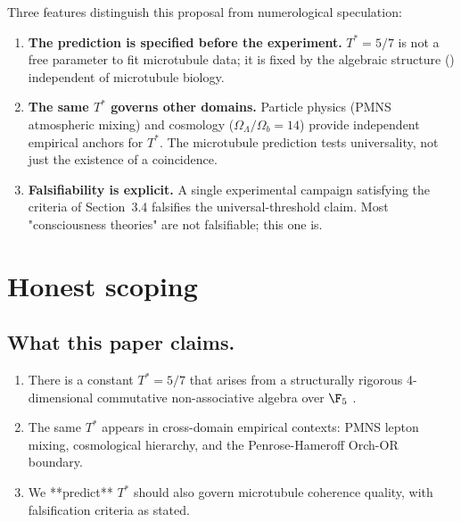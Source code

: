 \documentclass[11pt,reqno]{amsart}
\theoremstyle{plain}
\theoremstyle{definition}
\theoremstyle{remark}
\begin{document}
Three features distinguish this proposal from numerological
speculation:

\begin{enumerate}
\item \textbf{The prediction is specified before the experiment.}
$T^{*} = 5/7$ is not a free parameter to fit microtubule data; it is
fixed by the algebraic structure
(\cite{Sanders2026Dirac, Sanders2026Cosmology}) independent of
microtubule biology.

\item \textbf{The same $T^{*}$ governs other domains.} Particle
physics (PMNS atmospheric mixing) and cosmology
($\Omega_\Lambda / \Omega_b = 14$) provide independent empirical
anchors for $T^{*}$. The microtubule prediction tests universality,
not just the existence of a coincidence.

\item \textbf{Falsifiability is explicit.} A single experimental
campaign satisfying the criteria of Section~3.4 falsifies the
universal-threshold claim. Most "consciousness theories" are not
falsifiable; this one is.
\end{enumerate}

\section{Honest scoping}

\subsection{What this paper claims.}
\begin{enumerate}
\item There is a constant $T^{*} = 5/7$ that arises from a structurally
rigorous 4-dimensional commutative non-associative algebra over $\F_5$
\cite{Sanders2026Dirac}.
\item The same $T^{*}$ appears in cross-domain empirical contexts:
PMNS lepton mixing, cosmological hierarchy, and the Penrose-Hameroff
Orch-OR boundary.
\item We **predict** $T^{*}$ should also govern microtubule coherence
quality, with falsification criteria as stated.
\end{enumerate}
\end{document}
